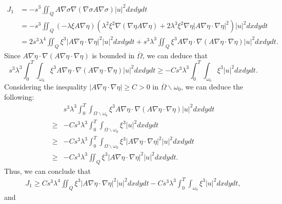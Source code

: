 \documentclass[9pt,reqno]{amsart}
\theoremstyle{plain}
\numberwithin{equation}{section}
\numberwithin{theorem}{section}
\def\Om{\Omega}
\def\Om{\Omega}
\begin{document}
	\begin{equation}
		\begin{aligned}
			J_1
			&=-s^3 \iint_Q A \nabla \sigma \nabla(\nabla \sigma A \nabla \sigma)|u|^2 dx dy dt\\
			&=-s^3 \iint_Q  \left( -\lambda \xi A \nabla \eta \right) \left( \lambda^2\xi^2 \nabla(\nabla \eta A \nabla \eta) + 2\lambda^3\xi^2 \nabla \eta \left| A \nabla \eta \cdot \nabla \eta \right| ^2\right) |u|^2 dx dy dt\\
			&=2s^3 \lambda^4 \iint_Q \xi^3\left|A \nabla \eta \cdot \nabla \eta \right|^2|u|^2 dx dy dt
			+ s^3 \lambda^3 \iint_Q \xi^3 A\nabla \eta \cdot \nabla(A\nabla \eta \cdot \nabla\eta)|u|^2 dx dy dt.
		\end{aligned}
	\end{equation}
	Since $A\nabla \eta \cdot\nabla(A\nabla \eta \cdot \nabla\eta)$ is bounded in $\overline{\Omega}$, we can deduce that
	$$
	s^3 \lambda^3 \int_{0}^{T}\int_{\omega_0} \xi^3 A\nabla \eta \cdot \nabla(A\nabla \eta \cdot \nabla\eta)|u|^2 dx dy dt \ge -C s^3 \lambda^3 \int_{0}^{T}\int_{\omega_0} \xi^3 |u|^2 dx dy dt.
	$$
	Considering the inequality $|A \nabla \eta \cdot \nabla \eta|\ge C>0$ in $\overline{\Omega} \backslash \omega_0$, we can deduce the following:
	$$
	\begin{aligned}
		&s^3 \lambda^3 \int_{0}^{T}\int_{\Om\backslash \omega_0} \xi^3 A\nabla \eta \cdot \nabla(A\nabla \eta \cdot \nabla\eta)|u|^2 dx dy dt\\
		\ge& -C s^3 \lambda^3 \int_{0}^{T}\int_{\Om\backslash \omega_0} \xi^3 |u|^2 dx dy dt\\
		\ge&
		-C s^3 \lambda^3 \int_{0}^{T}\int_{\Om\backslash \omega_0} \xi^3 \left|A \nabla \eta \cdot \nabla \eta \right|^2 |u|^2 dx dy dt\\
		\ge&
		-C s^3 \lambda^3 \iint_{Q} \xi^3 \left|A \nabla \eta \cdot \nabla \eta \right|^2 |u|^2 dx dy dt.
	\end{aligned}
	$$
	Thus, we can conclude that
	\begin{equation}\label{J1}
		\begin{aligned}
			J_1
			\geq C s^3 \lambda^4 \iint_Q \xi^3\left|A \nabla \eta \cdot \nabla \eta \right|^2|u|^2 dx dy dt-C s^3 \lambda^3  \int_0^T \int_{\omega_0} \xi^3|u|^2 dx dy dt,
		\end{aligned}
	\end{equation}
	and
\end{document}

